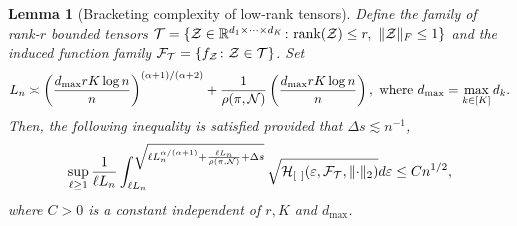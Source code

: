 \documentclass[twoside,11pt]{article}
\theoremstyle{plain}
\newtheorem{lem}{Lemma}
\theoremstyle{definition}
\def\rank{\textup{rank}}
\begin{document}
\begin{lem}[Bracketing complexity of low-rank tensors] \label{lem:metric}
Define the family of rank-$r$ bounded tensors $\tT=\{\tZ\in\mathbb{R}^{d_1\times \cdots \times d_K}\colon \rank(\tZ)\leq r, \ \FnormSize{}{\tZ}\leq 1\}$ and the induced function family $\mathcal{F}_{\mathcal{T}} = \{f_{\mathcal{Z}}\colon \mathcal{Z}\in\mathcal{T}\}$.  Set 
\begin{equation}\label{eq:specification}
L_n\asymp \left({d_{\max}rK\log n \over n } \right)^{(\alpha+1)/(\alpha+2)} + {1\over \rho (\pi, \mathcal{N})}\left({d_{\max}rK\log n \over n } \right),  \text{ where } d_{\max}  = \max_{k\in[K]}d_k.
\end{equation}
 Then, the following inequality is satisfied provided that $\Delta s \lesssim n^{-1}$,
\begin{equation}\label{eq:L}
\sup_{\ell\geq 1}{1\over \ell L_n}\int^{\sqrt{\ell L_n^{\alpha/(\alpha+1)}+{\ell L_n\over \rho (\pi, \mathcal{N})}+\Delta s}}_{\ell L_n} \sqrt{\mathcal{H}_{[\ ]}(\varepsilon, \mathcal{F}_{\mathcal{T}} ,\lVert\cdot\rVert_2) }d\varepsilon \leq Cn^{1/2},
\end{equation}
where $C>0$ is a constant independent of $r,K$  and $d_{\text{max}}$.
\end{lem}
\end{document}
